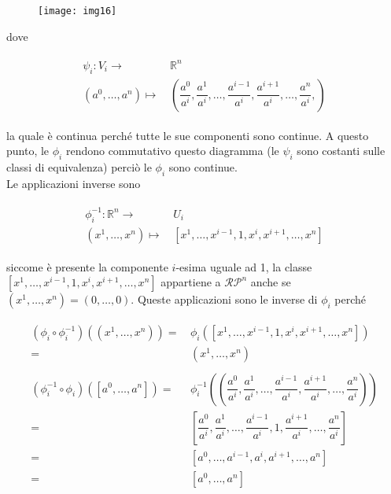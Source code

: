 \begin{figure}[H]
	\centering
	\texttt{[image: img16]}
\end{figure}

dove

\begin{align}
	\begin{split}
		\psi_{i} : V_{i} \to& \, \mathbb{R}^{n}\\
		(a^{0},\dots,a^{n}) \mapsto& \, \left( \dfrac{a^{0}}{a^{i}}, \dfrac{a^{1}}{a^{i}}, \dots, \dfrac{a^{i-1}}{a^{i}}, \dfrac{a^{i+1}}{a^{i}}, \dots, \dfrac{a^{n}}{a^{i}}, \right)
	\end{split}
\end{align}

la quale è continua perché tutte le sue componenti sono continue. A questo punto, le $ \phi_{i} $ rendono commutativo questo diagramma (le $ \psi_{i} $ sono costanti sulle classi di equivalenza) perciò le $ \phi_{i} $ sono continue.\\
Le applicazioni inverse sono

\begin{align}
	\begin{split}
		\phi_{i}^{-1} : \mathbb{R}^{n} \to& \, U_{i}\\
		(x^{1},\dots,x^{n}) \mapsto& \, [x^{1},\dots,x^{i-1},1,x^{i},x^{i+1},\dots,x^{n}]
	\end{split}
\end{align}

siccome è presente la componente $ i $-esima uguale ad 1, la classe $ [x^{1},\dots,x^{i-1},1,x^{i},x^{i+1},\dots,x^{n}] $ appartiene a $ \mathcal{RP}^{n} $ anche se $ (x^{1},\dots,x^{n}) = (0,\dots,0) $. Queste applicazioni sono le inverse di $ \phi_{i} $ perché

\begin{align}
	\begin{split}
		(\phi_{i} \circ \phi_{i}^{-1})((x^{1},\dots,x^{n})) =& \, \phi_{i}([x^{1},\dots,x^{i-1},1,x^{i},x^{i+1},\dots,x^{n}])\\
		=& \, (x^{1},\dots,x^{n})\\\\
		(\phi^{-1}_{i} \circ \phi_{i})([a^{0},\dots,a^{n}]) =& \, \phi_{i}^{-1}\left(\left( \dfrac{a^{0}}{a^{i}}, \dfrac{a^{1}}{a^{i}}, \dots, \dfrac{a^{i-1}}{a^{i}}, \dfrac{a^{i+1}}{a^{i}}, \dots, \dfrac{a^{n}}{a^{i}} \right)\right)\\
		=& \, \left[ \dfrac{a^{0}}{a^{i}}, \dfrac{a^{1}}{a^{i}}, \dots, \dfrac{a^{i-1}}{a^{i}}, 1, \dfrac{a^{i+1}}{a^{i}}, \dots, \dfrac{a^{n}}{a^{i}} \right]\\
		=& \, [a^{0},\dots,a^{i-1},a^{i},a^{i+1},\dots,a^{n}]\\
		=& \, [a^{0},\dots,a^{n}]
	\end{split}
\end{align}

